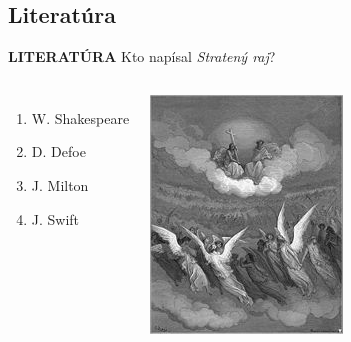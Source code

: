 \documentclass[dvipsnames]{beamer}
\begin{document}
\begin{frame}
	\subsection{Literatúra}
	\textbf{LITERATÚRA}
	\vskip 3mm
	Kto  napísal \textit{Stratený raj}?
	\begin{columns}
	\begin{enumerate}
		\item W. Shakespeare
		\item D. Defoe
		\item J. Milton
		\item J. Swift
	\end{enumerate}
		\includegraphics[scale=0.75]{lost}

	\end{columns}
\end{frame}
\end{document}
